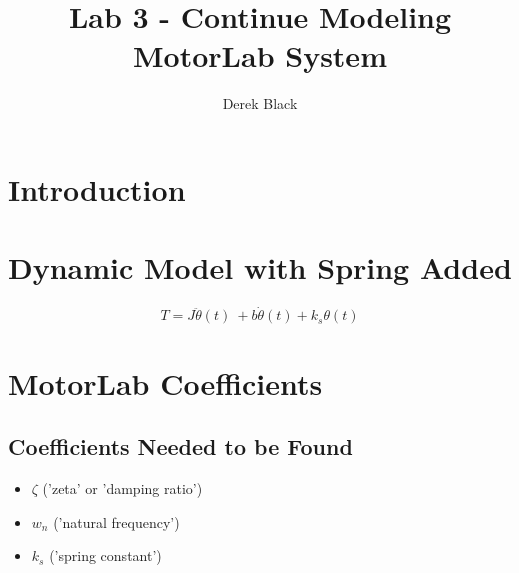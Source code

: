 \documentclass[11pt, oneside]{article}   	%
\title{\vspace{-3.5cm}Lab 3 - Continue Modeling MotorLab System}
\author{Derek Black}
\date{\vspace{-5ex}}
\begin{document}
\maketitle

\section{Introduction}

\section{Dynamic Model with Spring Added}

\[T = J \ddot \theta(t) \ + b \dot \theta(t) + k_s \theta(t) \]

\section{MotorLab Coefficients}

\subsection{Coefficients Needed to be Found}
\begin{itemize}
\item \(\zeta\)    ('zeta' or 'damping ratio')
\item \(w_n\)     ('natural frequency')
\item \(k_s\)      ('spring constant')
\end{itemize}
\end{document}
